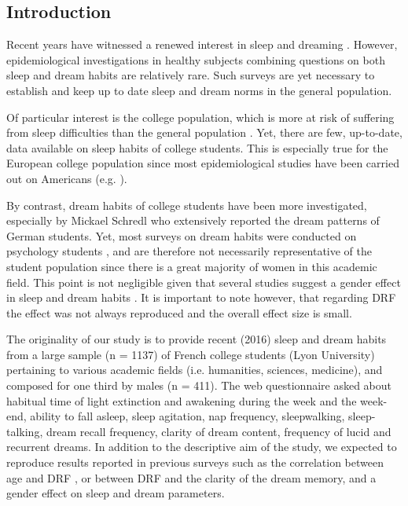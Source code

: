 \subsection*{Introduction}
\label{res:survey:intro}

Recent years have witnessed a renewed interest in sleep and dreaming \citep{dijk_dreaming_2015}. However, epidemiological investigations in healthy subjects combining questions on both sleep and dream habits are relatively rare. Such surveys are yet necessary to establish and keep up to date sleep and dream norms in the general population.

Of particular interest is the college population, which is more at risk of suffering from sleep difficulties than the general population \citep{buboltz_sleep_2001, curcio_sleep_2006, forquer_sleep_2008, lund_sleep_2010}. Yet, there are few, up-to-date, data available on sleep habits of college students. This is especially true for the European college population since most epidemiological studies have been carried out on Americans (e.g. \citealp{lund_sleep_2010}).

By contrast, dream habits of college students have been more investigated, especially by Mickael Schredl who extensively reported the dream patterns of German students. Yet, most surveys on dream habits were conducted on psychology students \citep{schredl_factors_2003}, and are therefore not necessarily representative of the student population since there is a great majority of women in this academic field. This point is not negligible given that several studies suggest a gender effect in sleep and dream habits \citep{beck_insomnia_2013, schredl_gender_2008}. It is important to note however, that regarding DRF the effect was not always reproduced and the overall effect size is small.

The originality of our study is to provide recent (2016) sleep and dream habits from a large sample (n = 1137) of French college students (Lyon University) pertaining to various academic fields (i.e. humanities, sciences, medicine), and composed for one third by males (n = 411). The web questionnaire asked about habitual time of light extinction and awakening during the week and the week-end, ability to fall asleep, sleep agitation, nap frequency, sleepwalking, sleep-talking, dream recall frequency, clarity of dream content, frequency of lucid and recurrent dreams. In addition to the descriptive aim of the study, we expected to reproduce results reported in previous surveys such as the correlation between age and DRF \citep{schredl_dream_2008}, or between DRF and the clarity of the dream memory, and a gender effect on sleep and dream parameters.


